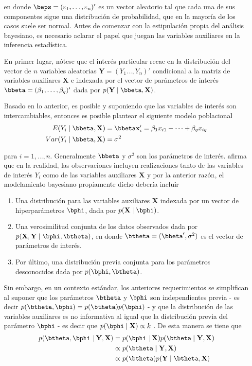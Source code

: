 en donde $\beps=(\varepsilon_1,\ldots,\varepsilon_n)'$ es un vector aleatorio tal que cada una de sus componentes sigue una distribución de probabilidad, que en la mayoría de los casos suele ser normal. Antes de comenzar con la estipulación propia del análisis bayesiano, es necesario aclarar el papel que juegan las variables auxiliares en la inferencia estadística.

En primer lugar, nótese que el interés particular recae en la distribución del vector de $n$ variables aleatorias $\mathbf{Y}=(Y_1\ldots,Y_n)'$
condicional a la matriz de variables auxiliares $\mathbf{X}$ e indexada por el vector de parámetros de interés $\bbeta=(\beta_1,\ldots,\beta_q)'$ dada por $p(\mathbf{Y} \mid \bbeta,\mathbf{X})$.

Basado en lo anterior, es posible y suponiendo que las variables de interés son intercambiables, entonces es posible plantear el siguiente modelo poblacional
\begin{align*}
E(Y_i \mid \bbeta,\mathbf{X})&=\bbeta\mathbf{x}_{i}'=\beta_1x_{i1}+\cdots+\beta_qx_{iq}\\
Var(Y_i \mid \bbeta,\mathbf{X})&=\sigma^2
\end{align*}

para $i=1,\ldots,n$. Generalmente $\bbeta$ y $\sigma^2$ son los parámetros de interés.  afirma que en la realidad, las observaciones incluyen realizaciones tanto de las variables de interés $Y_i$ como de las variables auxiliares $\mathbf{X}$ y por la anterior razón, el modelamiento bayesiano propiamente dicho debería incluir

\begin{enumerate}[a]
  \item Una distribución  para las variables auxiliares $\mathbf{X}$ indexada por un vector de hiperparámetros $\bphi$, dada por $p(\mathbf{X} \mid \bphi)$.
  \item Una verosimilitud conjunta de los datos observados dada por $p(\mathbf{X},\mathbf{Y} \mid \bphi,\btheta)$, en donde $\btheta=(\bbeta',\sigma^2)$ es el vector de parámetros de interés.
  \item  Por último, una distribución previa conjunta para los parámetros desconocidos dada por $p(\bphi,\btheta)$.
\end{enumerate}

Sin embargo, en un contexto estándar, los anteriores requerimientos se simplifican al suponer que los parámetros $\btheta$ y $\bphi$ son independientes previa - es decir $p(\btheta,\bphi)=p(\btheta)p(\bphi)$ - y que la distribución de las variables auxiliares es no informativa al igual que la distribución previa del parámetro $\bphi$ - es decir que $p(\bphi \mid \mathbf{X})\propto k$ . De esta manera se tiene que
\begin{align*}
p(\btheta,\bphi \mid \mathbf{Y},\mathbf{X} )&=p(\bphi \mid \mathbf{X})p(\btheta \mid \mathbf{Y},\mathbf{X})\\
&\propto p(\btheta \mid \mathbf{Y},\mathbf{X})\\
&\propto p(\btheta)p(\mathbf{Y} \mid \btheta,\mathbf{X})
\end{align*}

